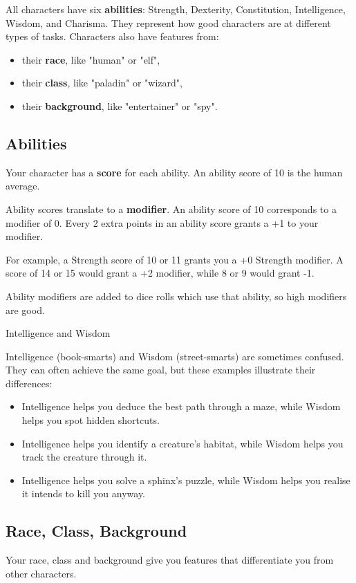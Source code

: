 \documentclass[letterpaper,twocolumn,openany,nodeprecatedcode,bg=print]{dndbook}
\begin{document}
All characters have six \textbf{abilities}: Strength, Dexterity, Constitution, Intelligence, Wisdom, and Charisma. They represent how good characters are at different types of tasks. Characters also have features from:

\begin{itemize}
\item their \textbf{race}, like "human" or "elf",
\item their \textbf{class}, like "paladin" or "wizard",
\item their \textbf{background}, like "entertainer" or "spy".
\end{itemize}

\subsection{Abilities}
Your character has a \textbf{score} for each ability. An ability score of 10 is the human average.


Ability scores translate to a \textbf{modifier}. An ability score of 10 corresponds to a modifier of 0. Every 2 extra points in an ability score grants a +1 to your modifier. 

For example, a Strength score of 10 or 11 grants you a +0 Strength modifier. A score of 14 or 15 would grant a +2 modifier, while 8 or 9 would grant -1.

Ability modifiers are added to dice rolls which use that ability, so high modifiers are good.


\begin{DndComment}{Intelligence and Wisdom}

\noindent Intelligence (book-smarts) and Wisdom (street-smarts) are sometimes confused. They can often achieve the same goal, but these examples illustrate their differences:
\begin{itemize}
\item Intelligence helps you deduce the best path through a maze, while Wisdom helps you spot hidden shortcuts.
\item Intelligence helps you identify a creature's habitat, while Wisdom helps you track the creature through it.
\item Intelligence helps you solve a sphinx's puzzle, while Wisdom helps you realise it intends to kill you anyway.
\end{itemize}
\end{DndComment}

\subsection{Race, Class, Background}
Your race, class and background give you features that differentiate you from other characters. 
\end{document}
